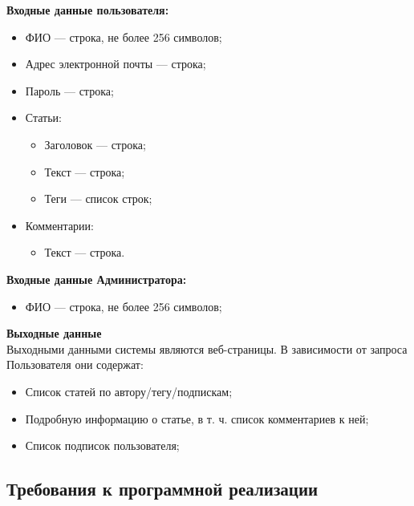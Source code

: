 \documentclass{bmstu-gost-7-32}
\begin{document}
\textbf{Входные данные пользователя:}
\begin{itemize}
	\item ФИО — строка, не более 256 символов;
	\item Адрес электронной почты — строка;
	\item Пароль — строка;
	\item Статьи:
	\begin{itemize}
		\item Заголовок — строка;
		\item Текст — строка;
		\item Теги — список строк;
	\end{itemize}
	\item Комментарии:
	\begin{itemize}
		\item Текст — строка.
	\end{itemize}
\end{itemize}

\textbf{Входные данные Администратора:}
\begin{itemize}
	\item ФИО — строка, не более 256 символов;
\end{itemize}

\textbf{Выходные данные}\\
Выходными данными системы являются веб-страницы.
В зависимости от запроса Пользователя они содержат:
\begin{itemize}
	\item Список статей по автору/тегу/подпискам;
	\item Подробную информацию о статье, в т. ч. список комментариев к ней;
	\item Список подписок пользователя;
\end{itemize}

\subsection{Требования к программной реализации}
\end{document}
